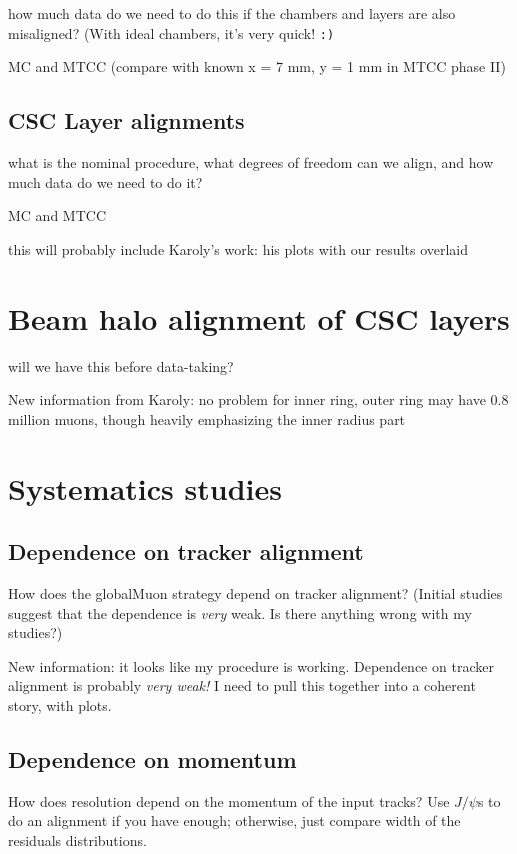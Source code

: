 \documentclass[12pt]{article}
\begin{document}
how much data do we need to do this if the
chambers and layers are also misaligned?  (With ideal chambers,
it's very quick! {\tt :)}

MC and MTCC (compare with known x = 7 mm, y = 1 mm in MTCC phase II)

\subsection{CSC Layer alignments}

what is the nominal procedure, what degrees
of freedom can we align, and how much data do we need to do it?

MC and MTCC

this will probably include Karoly's work: his plots with our results overlaid

\section{Beam halo alignment of CSC layers}

will we have this before data-taking?

New information from Karoly: no problem for inner ring, outer ring may
have 0.8 million muons, though heavily emphasizing the inner radius part

\section{Systematics studies}

\subsection{Dependence on tracker alignment}

How does the globalMuon strategy depend on tracker alignment?
(Initial studies suggest that the dependence is {\it very} weak.  Is
there anything wrong with my studies?)

New information: it looks like my procedure is working.  Dependence on
tracker alignment is probably {\it very weak!}  I need to pull this
together into a coherent story, with plots.

\subsection{Dependence on momentum}

How does resolution depend on the momentum of the input tracks?
Use $J/\psi$s to do an alignment if you have enough; otherwise, just
compare width of the residuals distributions.
\end{document}

